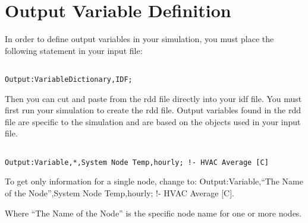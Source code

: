 \section{Output Variable Definition}\label{output-variable-definition}

In order to define output variables in your simulation, you must place the following statement in your input file:

\begin{lstlisting}

Output:VariableDictionary,IDF;
\end{lstlisting}

Then you can cut and paste from the rdd file directly into your idf file. You must first run your simulation to create the rdd file. Output variables found in the rdd file are specific to the simulation and are based on the objects used in your input file.

\begin{lstlisting}

Output:Variable,*,System Node Temp,hourly; !- HVAC Average [C]
\end{lstlisting}

To get only information for a single node, change to: Output:Variable,``The Name of the Node'',System Node Temp,hourly; !- HVAC Average {[}C{]}.

Where ``The Name of the Node'' is the specific node name for one or more nodes.
